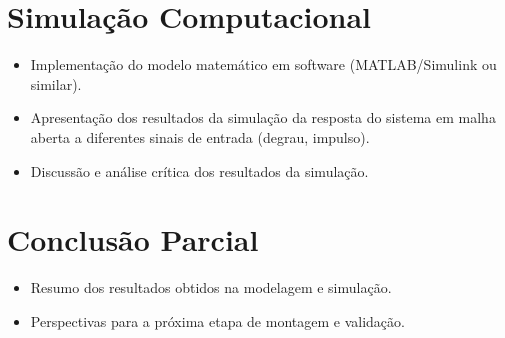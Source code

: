 \documentclass[9pt,a4paper,twocolumn,twoside]{tau-class/tau}
\begin{document}
\section{Simulação Computacional}
\begin{itemize}
    \item Implementação do modelo matemático em software (MATLAB/Simulink ou similar).
    \item Apresentação dos resultados da simulação da resposta do sistema em malha aberta a diferentes sinais de entrada (degrau, impulso).
    \item Discussão e análise crítica dos resultados da simulação.
\end{itemize}

\section{Conclusão Parcial}
\begin{itemize}
    \item Resumo dos resultados obtidos na modelagem e simulação.
    \item Perspectivas para a próxima etapa de montagem e validação.
\end{itemize}

    
    
    
    


\printbibliography

\end{document}
